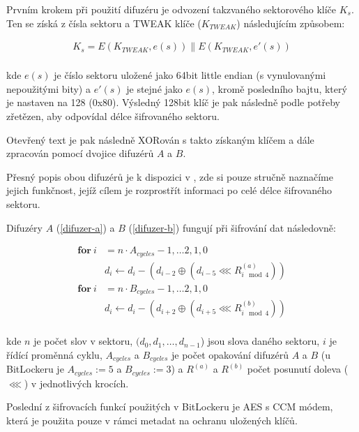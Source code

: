Prvním krokem při použití difuzéru je odvození takzvaného sektorového klíče $K_s$. Ten se získá z čísla sektoru a TWEAK klíče ($K_{TWEAK}$) následujícím způsobem:

\begin{align*}
K_s = E(K_{TWEAK}, e(s)) \parallel E(K_{TWEAK}, e'(s)) \\
\end{align*}

kde $e(s)$ je číslo sektoru uložené jako 64bit little endian (s vynulovanými nepoužitými bity) a $e'(s)$ je stejné jako $e(s)$, kromě posledního bajtu, který je nastaven na 128 (0x80). Výsledný 128bit klíč je pak následně podle potřeby zřetězen, aby odpovídal délce šifrovaného sektoru.\cite{Ferguson2006}\cite{Kumar2008}\cite{Rosendorf2013}

Otevřený text je pak následně XORován s takto získaným klíčem a dále zpracován pomocí dvojice difuzérů $A$ a $B$.

Přesný popis obou difuzérů je k dispozici v \cite{Ferguson2006}, zde si pouze stručně naznačíme jejich funkčnost, jejíž cílem je rozprostřít informaci po celé délce šifrovaného sektoru.

Difuzéry $A$ (\ref{difuzer-a}) a $B$ (\ref{difuzer-b}) fungují při šifrování dat následovně:

\begin{align}
\mathbf{for}\ i &= n \cdot A_{cycles} - 1,  \dots 2, 1, 0 \nonumber \\
	&d_i \leftarrow d_i - (d_{i-2} \oplus (d_{i-5} \lll R^{(a)}_{i \mod 4})) \label{difuzer-a} \\
\mathbf{for}\ i &= n \cdot B_{cycles} - 1,  \dots 2, 1, 0 \nonumber \\
	&d_i \leftarrow d_i - (d_{i+2} \oplus (d_{i+5} \lll R^{(b)}_{i \mod 4})) \label{difuzer-b} \\
\nonumber
\end{align}

kde $n$ je počet slov v sektoru, $(d_0, d_1,\dots,d_{n-1}$) jsou slova daného sektoru, $i$ je řídící proměnná cyklu, $A_{cycles}$ a $B_{cycles}$ je počet opakování difuzérů $A$ a $B$ (u BitLockeru je $A_{cycles} := 5$ a $B_{cycles} := 3$) a $R^{(a)}$ a $R^{(b)}$ počet posunutí doleva ($\lll$) v jednotlivých krocích.\cite{Ferguson2006}




Poslední z šifrovacích funkcí použitých v BitLockeru je AES s CCM módem, která je použita pouze v rámci metadat na ochranu uložených klíčů.

